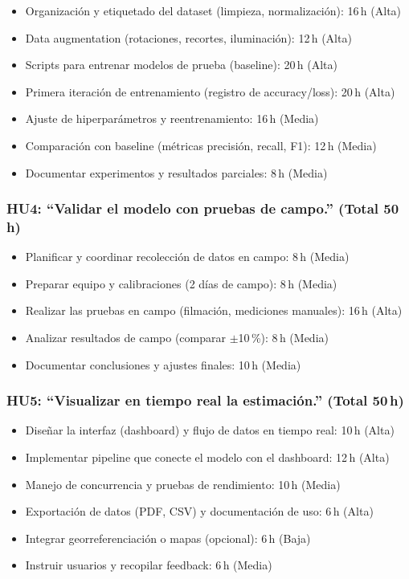 \documentclass[
11pt, %
]{ProyectoVpC}
\begin{document}
\begin{itemize}
  \item Organización y etiquetado del dataset (limpieza, normalización): 16\,h (Alta)
  \item Data augmentation (rotaciones, recortes, iluminación): 12\,h (Alta)
  \item Scripts para entrenar modelos de prueba (baseline): 20\,h (Alta)
  \item Primera iteración de entrenamiento (registro de accuracy/loss): 20\,h (Alta)
  \item Ajuste de hiperparámetros y reentrenamiento: 16\,h (Media)
  \item Comparación con baseline (métricas precisión, recall, F1): 12\,h (Media)
  \item Documentar experimentos y resultados parciales: 8\,h (Media)
\end{itemize}

\subsubsection*{HU4: “Validar el modelo con pruebas de campo.” (Total 50\,h)}

\begin{itemize}
  \item Planificar y coordinar recolección de datos en campo: 8\,h (Media)
  \item Preparar equipo y calibraciones (2 días de campo): 8\,h (Media)
  \item Realizar las pruebas en campo (filmación, mediciones manuales): 16\,h (Alta)
  \item Analizar resultados de campo (comparar \(\pm\)10\,\%): 8\,h (Media)
  \item Documentar conclusiones y ajustes finales: 10\,h (Media)
\end{itemize}

\subsubsection*{HU5: “Visualizar en tiempo real la estimación.” (Total 50\,h)}

\begin{itemize}
  \item Diseñar la interfaz (dashboard) y flujo de datos en tiempo real: 10\,h (Alta)
  \item Implementar pipeline que conecte el modelo con el dashboard: 12\,h (Alta)
  \item Manejo de concurrencia y pruebas de rendimiento: 10\,h (Media)
  \item Exportación de datos (PDF, CSV) y documentación de uso: 6\,h (Alta)
  \item Integrar georreferenciación o mapas (opcional): 6\,h (Baja)
  \item Instruir usuarios y recopilar feedback: 6\,h (Media)
\end{itemize}
\end{document}
